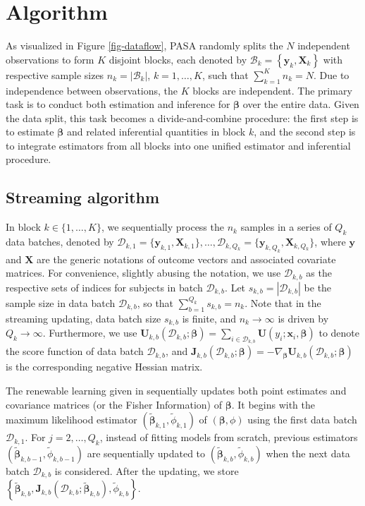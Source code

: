 \documentclass[12pt]{article}
\newcommand{\bJ}{\boldsymbol{J}}
\newcommand{\bU}{\boldsymbol{U}}
\newcommand{\bX}{\boldsymbol{X}}
\newcommand{\bx}{\boldsymbol{x}}
\newcommand{\by}{\boldsymbol{y}}
\newcommand{\bbeta}{\boldsymbol{\beta}}
\begin{document}
\section{Algorithm}
\label{sec:alg}

As visualized in Figure \ref{fig-dataflow}, PASA randomly splits the $N$ independent observations to form $K$ disjoint blocks, each denoted by $\mathcal{B}_k=\left\{\by_{k}, \bX_{k} \right\}$  with respective sample sizes $n_k=|\mathcal{B}_k|$, $k=1, \ldots, K$, such that $\sum_{k=1}^K n_k=N$. Due to independence between observations, the $K$ blocks are independent. The primary task is to conduct both estimation and inference for $\bbeta$ over the entire data. Given the data split, this task becomes a divide-and-combine procedure: the first step is to estimate $\bbeta$ and related inferential quantities in block $k$, and the second step is to integrate estimators from all blocks into one unified estimator and inferential procedure.

\subsection{Streaming algorithm}
\label{subsec:alg:stream}
In block $k \in \{1, \ldots, K\}$, we sequentially process the $n_k$ samples in a series of $Q_k$ data batches, denoted by $\mathcal{D}_{k,1} = \{\by_{k,1}, \bX_{k,1}\},\dots,\mathcal{D}_{k,Q_k}=\{\by_{k,Q_k},\bX_{k,Q_k} \}$, where $\by$ and $\bX$ are the generic notations of outcome vectors and associated covariate matrices. For convenience, slightly abusing the notation, we use $\mathcal{D}_{k,b}$ as the respective sets of indices for subjects in batch $\mathcal{D}_{k, b}$. Let $s_{k,b}=|\mathcal{D}_{k,b}|$ be the sample size in data batch $\mathcal{D}_{k,b}$, so that $\sum_{b=1}^{Q_k}s_{k,b}=n_k$. Note that in the streaming updating, data batch size $s_{k,b}$ is finite, and $n_k\to\infty$ is driven by $Q_k\to\infty$. Furthermore, we use $\bU_{k,b}(\mathcal{D}_{k,b};\bbeta) = \sum_{i\in\mathcal{D}_{k,b}}\bU(y_i;\bx_i,\bbeta)$ to denote the score function of data batch $\mathcal{D}_{k,b}$, and $\bJ_{k,b}(\mathcal{D}_{k,b};\bbeta) = - \nabla_{\bbeta} \bU_{k,b} (\mathcal{D}_{k,b}; \bbeta)$ is the corresponding negative Hessian matrix.

The renewable learning given in \cite{Luo-Song-2020} sequentially updates both point estimates and covariance matrices (or the Fisher Information) of $\bbeta$. It begins with the maximum likelihood estimator $(\widetilde{\bbeta}_{k,1}, \widetilde{\phi}_{k,1})$ of $(\bbeta, \phi)$ using the first data batch $\mathcal{D}_{k,1}$. For $j=2,\dots, Q_k$, instead of fitting models from scratch, previous estimators $( \widetilde{\bbeta}_{k,b-1}, \widetilde{\phi}_{k,b-1})$ are sequentially updated to $(\widetilde{\bbeta}_{k,b}, \widetilde{\phi}_{k,b})$ when the next data batch $\mathcal{D}_{k,b}$ is considered. After the updating, we store $\left\{\widetilde{\bbeta}_{k,b},\bJ_{k,b}(\mathcal{D}_{k,b};\widetilde{\bbeta}_{k,b}),\widetilde{\phi}_{k,b}\right\}$.
\end{document}
